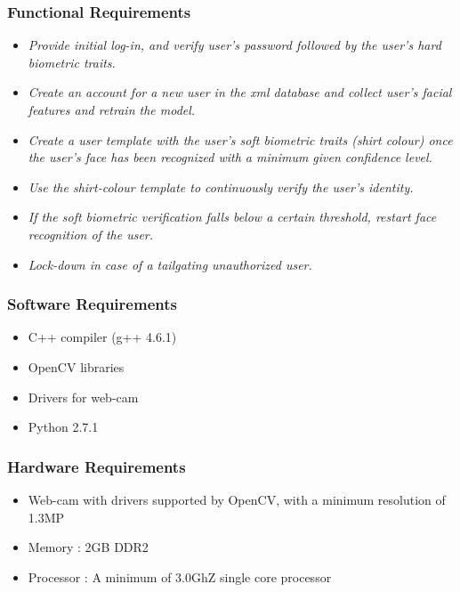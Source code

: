 \documentclass[12pt]{article}			%
\begin{document}
\subsubsection{ Functional Requirements }
\begin{itemize}
	\item{\it Provide initial log-in, and verify user's password followed by the user's hard biometric traits. }
	\item{\it Create an account for a new user in the xml database and collect user's facial features and retrain the model. }
	\item{\it Create a user template with the user's soft biometric traits (shirt colour) once the user's face has been recognized with a minimum given confidence level.  }
	\item{\it Use the shirt-colour template to continuously verify the user's identity.  }
	\item{\it If the soft biometric verification falls below a certain threshold, restart face recognition of the user.  }
	\item{\it Lock-down in case of a tailgating unauthorized user. }
\end{itemize}

\subsubsection{ Software Requirements }
\begin{itemize}
\item C++ compiler (g++ 4.6.1)
\item OpenCV libraries
\item Drivers for web-cam
\item Python 2.7.1
\end{itemize}

\subsubsection{ Hardware Requirements }
\begin{itemize}
\item Web-cam with drivers supported by OpenCV, with a minimum resolution of 1.3MP
\item Memory : 2GB DDR2
\item Processor : A minimum of 3.0GhZ single core processor
\end{itemize}
\end{document}
